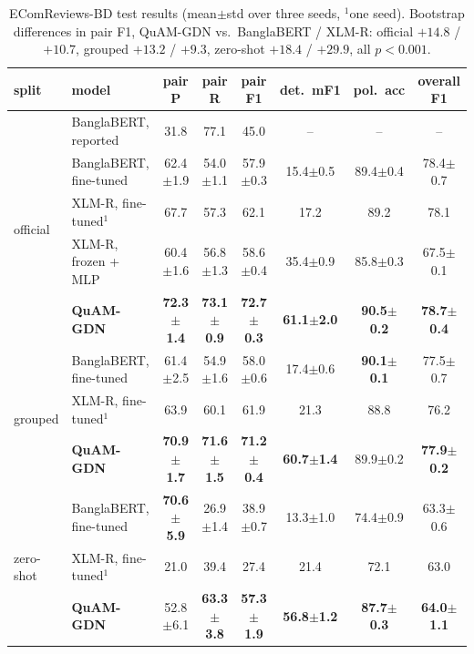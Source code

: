 \documentclass[11pt]{article}
\newcommand{\pmstd}[2]{#1{\scriptsize$\pm$#2}}
\newcommand{\quam}{QuAM-GDN}
\begin{document}
\begin{table}[t]
\centering\footnotesize
\setlength{\tabcolsep}{4pt}
\begin{tabular}{llcccccc}
\toprule
split & model & pair P & pair R & \textbf{pair F1} & det.\ mF1 & pol.\ acc & overall F1 \\
\midrule
\multirow{5}{*}{official}
 & BanglaBERT, reported \citep{haque2026ecomreviews} & 31.8 & 77.1 & 45.0 & -- & -- & -- \\
 & BanglaBERT, fine-tuned & \pmstd{62.4}{1.9} & \pmstd{54.0}{1.1} & \pmstd{57.9}{0.3} & \pmstd{15.4}{0.5} & \pmstd{89.4}{0.4} & \pmstd{78.4}{0.7} \\
 & XLM-R, fine-tuned$^1$ & 67.7 & 57.3 & 62.1 & 17.2 & 89.2 & 78.1 \\
 & XLM-R, frozen + MLP & \pmstd{60.4}{1.6} & \pmstd{56.8}{1.3} & \pmstd{58.6}{0.4} & \pmstd{35.4}{0.9} & \pmstd{85.8}{0.3} & \pmstd{67.5}{0.1} \\
 & \textbf{\quam{}} & \textbf{\pmstd{72.3}{1.4}} & \textbf{\pmstd{73.1}{0.9}} & \textbf{\pmstd{72.7}{0.3}} & \textbf{\pmstd{61.1}{2.0}} & \textbf{\pmstd{90.5}{0.2}} & \textbf{\pmstd{78.7}{0.4}} \\
\midrule
\multirow{3}{*}{grouped}
 & BanglaBERT, fine-tuned & \pmstd{61.4}{2.5} & \pmstd{54.9}{1.6} & \pmstd{58.0}{0.6} & \pmstd{17.4}{0.6} & \textbf{\pmstd{90.1}{0.1}} & \pmstd{77.5}{0.7} \\
 & XLM-R, fine-tuned$^1$ & 63.9 & 60.1 & 61.9 & 21.3 & 88.8 & 76.2 \\
 & \textbf{\quam{}} & \textbf{\pmstd{70.9}{1.7}} & \textbf{\pmstd{71.6}{1.5}} & \textbf{\pmstd{71.2}{0.4}} & \textbf{\pmstd{60.7}{1.4}} & \pmstd{89.9}{0.2} & \textbf{\pmstd{77.9}{0.2}} \\
\midrule
\multirow{3}{*}{zero-shot}
 & BanglaBERT, fine-tuned & \textbf{\pmstd{70.6}{5.9}} & \pmstd{26.9}{1.4} & \pmstd{38.9}{0.7} & \pmstd{13.3}{1.0} & \pmstd{74.4}{0.9} & \pmstd{63.3}{0.6} \\
 & XLM-R, fine-tuned$^1$ & 21.0 & 39.4 & 27.4 & 21.4 & 72.1 & 63.0 \\
 & \textbf{\quam{}} & \pmstd{52.8}{6.1} & \textbf{\pmstd{63.3}{3.8}} & \textbf{\pmstd{57.3}{1.9}} & \textbf{\pmstd{56.8}{1.2}} & \textbf{\pmstd{87.7}{0.3}} & \textbf{\pmstd{64.0}{1.1}} \\
\bottomrule
\end{tabular}
\caption{EComReviews-BD test results (mean$\pm$std over three seeds, $^1$one seed). Bootstrap
differences in pair F1, \quam{} vs.\ BanglaBERT / XLM-R: official $+14.8$ / $+10.7$, grouped $+13.2$ /
$+9.3$, zero-shot $+18.4$ / $+29.9$, all $p<0.001$.}
\label{tab:main}
\end{table}
\end{document}
